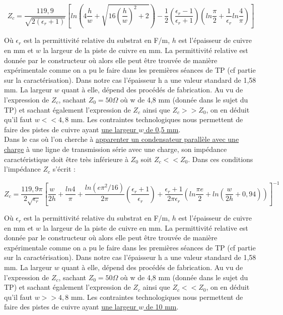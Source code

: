 \documentclass[french]{article}
\begin{document}
\begin{equation}
	Z_c = \frac{119,9}{\sqrt{2(\epsilon_r + 1)}} \left[ ln\left(4\frac{h}{w} + \sqrt{16\left(\frac{h}{w}\right)^2 + 2}\right) - \frac{1}{2}\left(\frac{\epsilon_r - 1}{\epsilon_r + 1}\right) \left(ln\frac{\pi}{2} + \frac{1}{\epsilon_r}ln\frac{4}{\pi}\right) \right]
	\label{eq:Z_c_bobine}
\end{equation}

Où $\epsilon_r$ est la permittivité relative du substrat en F/m, $h$ est l'épaisseur de cuivre en mm et $w$ la largeur de la piste de cuivre en mm. La permittivité relative est donnée par le constructeur où alors elle peut être trouvée de manière expérimentale comme on a pu le faire dans les premières séances de TP (cf partie sur la caractérisation). Dans notre cas l'épaisseur h a une valeur standard de 1,58 mm. La largeur $w$ quant à elle, dépend des procédés de fabrication. Au vu de l'expression de $Z_c$, sachant $Z_0=50 \Omega$ où w de 4,8 mm (donnée dans le sujet du TP) et sachant également l'expression de $Z_c$ ainsi que $Z_c >> Z_0$, on en déduit qu'il faut $w << 4,8$ mm. Les contraintes technologiques nous permettent de faire des pistes de cuivre ayant \underline{une largeur $w$ de 0,5 mm}.\\

Dans le cas où l'on cherche à \underline{apparenter un condensateur parallèle avec une charge} à une ligne de transmission série avec une charge, son impédance caractéristique doit être très inférieure à $Z_0$ soit $Z_c << Z_0$. Dans ces conditions l'impédance $Z_c$ s'écrit :

\begin{equation}
	Z_c= \frac{119,9\pi}{2\sqrt{\epsilon_r}}\left[\frac{w}{2h} + \frac{ln4}{\pi} + \frac{ln(e\pi^2 / 16)}{2\pi}\left(\frac{\epsilon_r + 1}{\epsilon_r}\right) + \frac{\epsilon_r + 1}{2\pi \epsilon_r} \left( ln\frac{\pi e}{2} +  ln\left(\frac{w}{2h} + 0,94 \right) \right)  \right]^{-1}
	\label{eq:Z_c_condo}
\end{equation}


Où $\epsilon_r$ est la permittivité relative du substrat en F/m, $h$ est l'épaisseur de cuivre en mm et $w$ la largeur de la piste de cuivre en mm. La permittivité relative est donnée par le constructeur où alors elle peut être trouvée de manière expérimentale comme on a pu le faire dans les premières séances de TP (cf partie sur la caractérisation). Dans notre cas l'épaisseur h a une valeur standard de 1,58 mm. La largeur $w$ quant à elle, dépend des procédés de fabrication. Au vu de l'expression de $Z_c$, sachant $Z_0=50 \Omega$ où w de 4,8 mm (donnée dans le sujet du TP) et sachant également l'expression de $Z_c$ ainsi que $Z_c << Z_0$, on en déduit qu'il faut $w >> 4,8$ mm. Les contraintes technologiques nous permettent de faire des pistes de cuivre ayant \underline{une largeur $w$ de 10 mm}.\\
\end{document}

